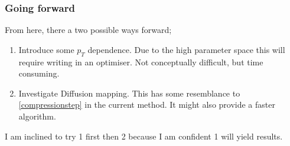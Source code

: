 \subsubsection{Going forward}
From here, there a two possible ways forward;
\begin{enumerate}
    \item Introduce some \(p_T\) dependence.
        Due to the high parameter space this will require writing in
        an optimiser.
        Not conceptually difficult, but time consuming.
    \item Investigate Diffusion mapping.
        This has some resemblance to \ref{compressionstep} in the current method.
        It might also provide a faster algorithm.
\end{enumerate}

I am inclined to try 1 first then 2
because I am confident 1 will yield results.
